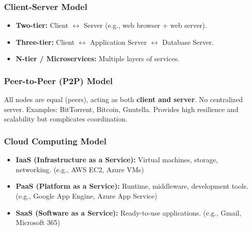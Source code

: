 \documentclass[11pt,a4paper]{article}
\begin{document}
\subsubsection{Client-Server Model}
\begin{center}
\end{center}

\begin{itemize}[leftmargin=*, itemsep=3pt]
  \item \textbf{Two-tier:} Client $\leftrightarrow$ Server (e.g., web browser + web server).
  \item \textbf{Three-tier:} Client $\leftrightarrow$ Application Server $\leftrightarrow$ Database Server.
  \item \textbf{N-tier / Microservices:} Multiple layers of services.
\end{itemize}

\subsubsection{Peer-to-Peer (P2P) Model}
All nodes are equal (peers), acting as both \textbf{client and server}. No centralized server. Examples: BitTorrent, Bitcoin, Gnutella. Provides high resilience and scalability but complicates coordination.

\subsubsection{Cloud Computing Model}
\begin{conceptbox}
\begin{itemize}[leftmargin=*, itemsep=3pt]
  \item \textbf{IaaS (Infrastructure as a Service):} Virtual machines, storage, networking. (e.g., AWS EC2, Azure VMs)
  \item \textbf{PaaS (Platform as a Service):} Runtime, middleware, development tools. (e.g., Google App Engine, Azure App Service)
  \item \textbf{SaaS (Software as a Service):} Ready-to-use applications. (e.g., Gmail, Microsoft 365)
\end{itemize}
\end{conceptbox}
\end{document}
